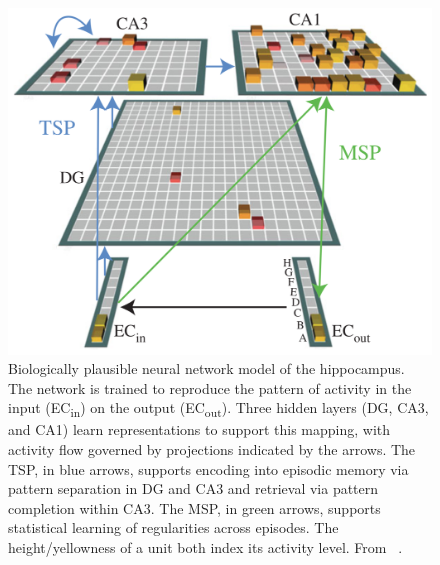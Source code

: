 \setlength{\columnsep}{20pt}
\begin{figure}
\centering
\includegraphics[width=.44\textwidth]{figs/hipp-model}
\caption{\small Biologically plausible neural network model of the
hippocampus. The network is trained to reproduce the pattern of
activity in the input (EC\textsubscript{in}) on the output
(EC\textsubscript{out}). Three hidden layers (DG, CA3, and CA1) learn
representations to support this mapping, with activity flow governed
by projections indicated by the arrows. The TSP, in blue
arrows, supports encoding into episodic memory via pattern separation
in DG and CA3 and retrieval via pattern completion within CA3. The
MSP, in green arrows, supports statistical learning of
regularities across episodes. The height/yellowness of a unit both
index its activity level. From ~\citet{Schapiro:2017}.}
    \label{fig:hipp}
    \vskip-10pt
\end{figure}


